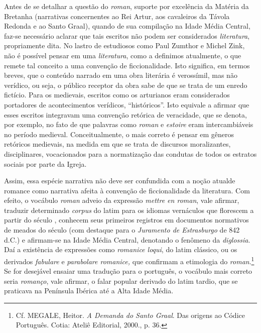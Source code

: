 Antes de se detalhar a questão do \textit{roman}, suporte por excelência da
Matéria da Bretanha (narrativas concernentes ao Rei Artur, aos cavaleiros da
Távola Redonda e ao Santo Graal), quando de sua compilação na Idade Média
Central, faz-se necessário aclarar que tais escritos não podem ser considerados
\textit{literatura}, propriamente dita. No lastro de estudiosos como Paul
Zumthor e Michel Zink, não é possível pensar em uma \textit{literatura}, como a
definimos atualmente, o que remete tal conceito a uma convenção de
ficcionalidade. Isto significa, em termos breves, que o conteúdo narrado em uma
obra literária é verossímil, mas não verídico, ou seja, o público receptor da
obra sabe de que se trata de um enredo fictício. Para os medievais, escritos
como os arturianos eram considerados portadores de acontecimentos verídicos,
“históricos”. Isto equivale a afirmar que esses escritos integravam uma
convenção retórica de veracidade, que se denota, por exemplo, no fato de que
palavras como \textit{roman} e \textit{estoire} eram intercambiáveis no período
medieval. Conceitualmente, o mais correto é pensar em gêneros retóricos
medievais, na medida em que se trata de discursos moralizantes, disciplinares,
vocacionados para a normatização das condutas de todos os estratos sociais por
parte da Igreja. 

Assim, essa espécie narrativa não deve ser confundida com a noção atualde
romance como narrativa afeita à convenção de ficcionalidade da literatura. Com
efeito, o vocábulo \textit{roman} adveio da expressão \textit{mettre en roman},
vale afirmar, traduzir determinado \textit{corpus} do latim para os idiomas
vernáculos que florescem a partir do século , conhecem seus primeiros
registros em documentos normativos de meados do século  (com destaque para o
\textit{Juramento de Estrasburgo} de 842 d.C.) e afirmam-se na Idade Média
Central, denotando o fenômeno da \textit{diglossia}. Daí a existência de
expressões como \textit{romanice loqui}, do latim clássico, ou os derivados
\textit{fabulare} e \textit{parabolare romanice,} que confirmam a etimologia do
\textit{roman}.\footnote{ Cf. MEGALE, Heitor.\textit{ A Demanda do Santo Graal}.
Das origens ao Códice Português. Cotia: Ateliê Editorial, 2000., p. 36.} Se
for desejável ensaiar uma tradução para o português, o vocábulo mais correto
seria \textit{romanço}, vale afirmar, o falar popular derivado do latim tardio,
que se praticava na Península Ibérica até a Alta Idade Média. 

